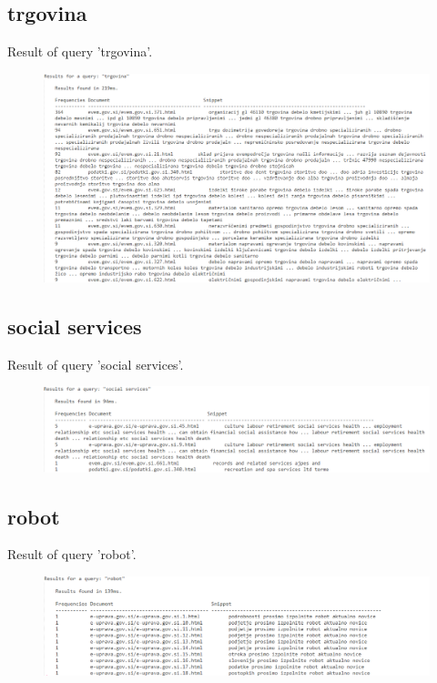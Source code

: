 \documentclass[9pt]{IEEEtran}
\begin{document}
\subsection{trgovina}

Result of query 'trgovina'.
\begin{figure}[ht]
    \centering
    \includegraphics[width=1\columnwidth]{trgovina.png}

    \label{fig2}
\end{figure}


\subsection{social services}

Result of query 'social services'.
\begin{figure}[ht]
    \centering
    \includegraphics[width=1\columnwidth]{social_services.png}

    \label{fig3}
\end{figure}

\clearpage

\subsection{robot}
Result of query 'robot'.
\begin{figure}[ht]
    \centering
    \includegraphics[width=1\columnwidth]{robot.png}

    \label{fig4}
\end{figure}
\end{document}
